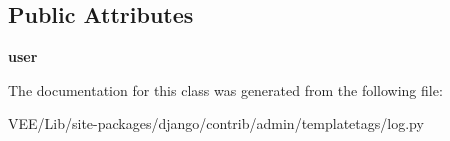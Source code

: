 \subsection*{Public Attributes}
\begin{DoxyCompactItemize}
\item 
\mbox{\label{classdjango_1_1contrib_1_1admin_1_1templatetags_1_1log_1_1_admin_log_node_aef1177dfa8bb810d1c622f2744e16971}} 
{\bfseries user}
\end{DoxyCompactItemize}


The documentation for this class was generated from the following file\+:\begin{DoxyCompactItemize}
\item 
V\+E\+E/\+Lib/site-\/packages/django/contrib/admin/templatetags/log.\+py\end{DoxyCompactItemize}

